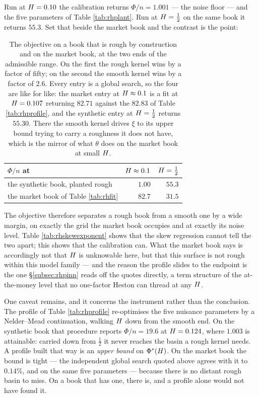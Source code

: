 Run at $H=0.10$ the calibration returns $\Phi/n=1.001$ --- the noise floor --- and the five
parameters of Table \ref{tab:rhplant}. Run at $H=\tfrac12$ on the same book it returns $55.3$.
Set that beside the market book and the contrast is the point:

\begin{table}[H]
\centering
\small
\begin{tabular}{lrr}
\hline
$\Phi/n$ at & $H\approx0.1$ & $H=\tfrac12$\\
\hline
the synthetic book, planted rough & $\mathbf{1.00}$ & $55.3$\\
the market book of Table \ref{tab:rhfit} & $82.7$ & $\mathbf{31.5}$\\
\hline
\end{tabular}
\caption[Rough and smooth kernels on both books]{The objective on a book that is rough by construction and on the market book, at the two
ends of the admissible range. On the first the rough kernel wins by a factor of fifty; on the second
the smooth kernel wins by a factor of $2.6$. Every entry is a global search, so the four are
like for like: the market entry at $H\approx0.1$ is a fit at $H=0.107$ returning $82.71$
against the $82.83$ of Table \ref{tab:rhprofile}, and the synthetic entry at $H=\tfrac12$
returns $55.30$. There the smooth kernel drives $\xi$ to its upper bound trying to carry a roughness
it does not have, which is the mirror of what $\theta$ does on the market book at small $H$.}
\label{tab:rhplantcompare}
\end{table}

The objective therefore separates a rough book from a smooth one by a wide margin, on exactly the
grid the market book occupies and at exactly its noise level. Table \ref{tab:rhskewexponent} shows
that the skew regression cannot tell the two apart; this shows that the calibration can. What the
market book says is accordingly not that $H$ is unknowable here, but that this surface is not
rough within this model family --- and the reason the profile slides to the endpoint is the one
\S\ref{subsec:rhpinn} reads off the quotes directly, a term structure of the at-the-money level that
no one-factor Heston can thread at any $H$.

One caveat remains, and it concerns the instrument rather than the conclusion. The profile of Table
\ref{tab:rhprofile} re-optimises the five nuisance parameters by a Nelder--Mead continuation,
walking $H$ down from the smooth end. On the synthetic book that procedure reports
$\Phi/n=19.6$ at $H=0.124$, where $1.003$ is attainable: carried down from $\tfrac12$ it never
reaches the basin a rough kernel needs. A profile built that way is an \emph{upper bound} on
$\Phi^{*}(H)$. On the market book the bound is tight --- the independent global search quoted
above agrees with it to $0.14\%$, and on the same five parameters --- because there is no distant
rough basin to miss. On a book that has one, there is, and a profile alone would not have found it.

